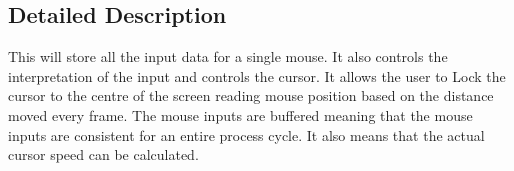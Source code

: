 \subsection{Detailed Description}
This will store all the input data for a single mouse. It also controls the interpretation of the input and controls the cursor. It allows the user to Lock the cursor to the centre of the screen reading mouse position based on the distance moved every frame. The mouse inputs are buffered meaning that the mouse inputs are consistent for an entire process cycle. It also means that the actual cursor speed can be calculated. 